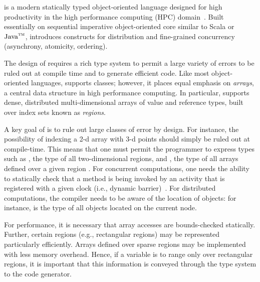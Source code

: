 
%

%
%
%

\Xten{} is a modern statically typed object-oriented
language designed for high productivity in the high performance
computing (HPC) domain~\cite{X10}. Built essentially on
sequential imperative object-oriented core
similar to
Scala or
$\mbox{Java}^{\mbox{\scriptsize\sc tm}}$,
\Xten{} introduces constructs for distribution and
fine-grained concurrency (asynchrony, atomicity, ordering).

The design of \Xten{} requires a rich type system to permit a
large variety of errors to be ruled out at compile time and to 
generate efficient code.  
Like most object-oriented languages, \Xten{} supports classes;
however, it places
equal emphasis on {\em arrays}, a central data structure in high
performance computing.
In particular, \Xten{} supports dense,
distributed multi-dimensional arrays of value and reference types,
built over index sets known as {\em regions}.%

A key goal of \Xten{} is to rule out large classes of error
by design. For instance, the possibility of indexing a 2-d array with 3-d
points should simply be ruled out at compile-time. This means that one
must permit the programmer to express types such as ,
the type of all two-dimensional regions, and
, the type of all  arrays
defined over a given region .
For concurrent computations, one needs the ability to
statically check that a method is being invoked by an activity that is
registered with a given clock (i.e., dynamic barrier)~\cite{X10}.
For distributed computations, the compiler needs to be aware of
the location of objects: for instance,
 is the type of all  objects located on the
current node.

For performance, it is necessary that array accesses are
bounds-checked statically.  Further, certain regions (e.g.,
rectangular regions) may be represented particularly
efficiently.  Arrays defined over sparse regions may be
implemented with less memory overhead.
Hence, if a variable is to range only over
rectangular regions, it is important that this information is
conveyed through the type system to the code generator.

